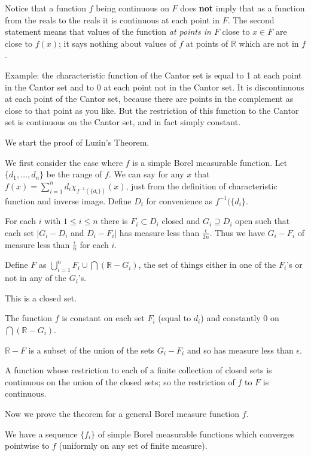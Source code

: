 \documentclass[12pt]{article}
\begin{document}
Notice that a function $f$ being continuous on $F$ does {\bf not} imply that as a function from the reals to the reals it is continuous at each point in $F$.  The second statement means that values of the function {\em at points in $F$\/} close to $x \in F$ are close to $f(x)$;  it says nothing about
values of $f$ at points of $\mathbb R$ which are not in $f$.

Example:  the characteristic function of the Cantor set is equal to 1 at each point in the Cantor set and to 0 at each point not in the Cantor set.
It is discontinuous at each point of the Cantor set, because there are points in the complement as close to that point as you like.  But the restriction of this function to the Cantor set is continuous on the Cantor set, and in fact simply constant.

We start the proof of Luzin's Theorem.

We first consider the case where $f$ is a simple Borel measurable function.  Let $\{d_1,\ldots,d_n\}$ be the range of $f$.  We can say for any $x$ that
$f(x) = \sum_{i=1}^n d_i\chi_{f^{-1}(\{d_i\})}(x)$, just from the definition of characteristic function and inverse image.  Define $D_i$ for convenience as $f^{-1}(\{d_i\}$.

For each $i$ with $1 \leq i \leq n$ there is $F_i \subset D_i$ closed and $G_i \supseteq D_i$ open such that each set $|G_i-D_i$ and $D_i-F_i|$ has measure less than $\frac\epsilon{2n}$.  Thus we have $G_i - F_i$ of measure less than $\frac\epsilon n$ for each $i$.

Define $F$ as $\bigcup_{i=1}^n F_i \cup \bigcap(\mathbb R - G_i)$, the set of things either in one of the $F_i$'s or not in any of the $G_i$'s.

This is a closed set.

The function $f$ is constant on each set $F_i$ (equal to $d_i$) and constantly 0 on $\bigcap(\mathbb R - G_i)$.

$\mathbb R - F$ is a subset of the union of the sets $G_i - F_i$ and so has measure less than $\epsilon$.

A function whose restriction to each of a finite collection of closed sets is continuous on the union of the closed sets;  so the restriction of
$f$ to $F$ is continuous.

Now we prove the theorem for a general Borel measure function $f$.

We have a sequence $\{f_i\}$ of simple Borel measurable functions which converges pointwise to $f$ (uniformly on any set of finite measure).
\end{document}
